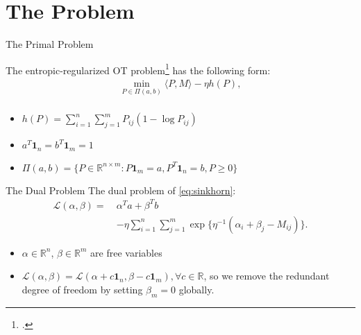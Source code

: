 \section{The Problem}
\begin{frame}{The Primal Problem}
    \begin{definition}
    \label{def:erot}
        The entropic-regularized OT problem\footcite{cuturi2013sinkhorn} has the following form:
        \begin{equation}
        \label{eq:sinkhorn}
        \begin{array}{c}
        \underset{P\in\Pi(a,b)}{\min} \langle P, M \rangle - \eta h(P), \\
        \end{array}
        \end{equation}
        \begin{itemize}
            \item $h(P) = \sum_{i=1}^{n}\sum_{j=1}^{m} P_{ij}(1 - \log P_{ij})$
            \item $a^T \mathbf{1}_n = b^T \mathbf{1}_m = 1$
            \item $\Pi(a,b)=\{P\in\mathbb{R}^{n\times m}:P\mathbf{1}_{m}=a,P^{T}\mathbf{1}_{n}=b,P\ge0\}$
        \end{itemize}
    \end{definition}
\end{frame}

\begin{frame}{The Dual Problem}
    The dual problem of \eqref{eq:sinkhorn}:
    \begin{align}
    \mathcal{L}(\alpha,\beta)=\ & \alpha^{T}a+\beta^{T}b \nonumber\\
     & -\eta\sum_{i=1}^{n}\sum_{j=1}^{m}\exp\{\eta^{-1}(\alpha_{i}+\beta_{j}-M_{ij})\}. \label{eq:dual}
    \end{align}
    \begin{itemize}
        \item $\alpha\in\mathbb{R}^n$, $\beta\in\mathbb{R}^m$ are free variables
        \item $\mathcal{L}(\alpha, \beta) = \mathcal{L}(\alpha + c \mathbf{1}_n, \beta - c \mathbf{1}_m), \forall c \in \mathbb{R}$, so we remove the redundant degree of freedom by setting $\beta_m = 0$ globally.
    \end{itemize}
\end{frame}

